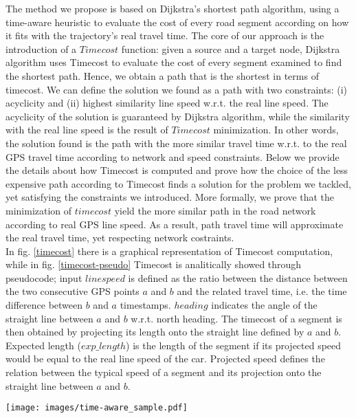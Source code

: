 \documentclass[5p]{elsarticle}
\begin{document}
The method we propose is based on Dijkstra's shortest path algorithm, using a time-aware heuristic to evaluate the cost of every road segment according on how it fits with the trajectory's real travel time.
The core of our approach is the introduction of a $Timecost$ function: given a source and a target node, Dijkstra algorithm uses Timecost to evaluate the cost of every segment 
examined to find the shortest path. 
Hence, we obtain a path that is the shortest in terms of timecost. We can define the solution we found as a path with two constraints: (i) acyclicity and (ii) highest similarity
line speed w.r.t. the real line speed. The acyclicity of the solution is guaranteed by Dijkstra algorithm, while the similarity with the real line speed is the result of $Timecost$ minimization. In other words, the solution found is the
path with the more similar travel time w.r.t. to the real GPS travel time according to network and speed constraints.
Below we provide the details about how Timecost is computed and prove how the choice of the less expensive path according to Timecost finds a solution for the problem we tackled,
yet satisfying the constraints we introduced. More formally, we prove that the minimization of
$timecost$ yield the more similar path in the road network according to real GPS line speed. As a result, path travel time will approximate the real travel time, yet 
respecting network costraints. \\
In fig. \ref{timecost} there is a graphical representation of Timecost computation, while in fig. \ref{timecost-pseudo} Timecost is analitically showed through pseudocode; input $linespeed$ is defined as the ratio between 
the distance between the two consecutive GPS points $a$ and $b$ and the related travel time, i.e. the time difference between $b$ and $a$ timestamps. $heading$ indicates the angle of the straight line between $a$ and $b$ w.r.t. north heading.
The timecost of a segment is then obtained by projecting its length onto the straight line defined by $a$ and $b$.
Expected length ($exp\_length$) is the length of the segment if its projected speed would be equal to the real
line speed of the car.
Projected speed defines the relation between the typical speed of a segment and its projection onto the straight line between $a$ and $b$. 


\begin{figure*}[t!]

\centering
\texttt{[image: images/time-aware\_sample.pdf]}
\caption{The computation of timecost for segment $r$: the length of segment is projected onto the straight line trajectory between GPS points $a$ and $b$, 
then the timecost is computed as the difference between the length and the supposed length of the segment, according to the straight line speed of the car.}
\label{timecost}
\end{figure*}
\end{document}
